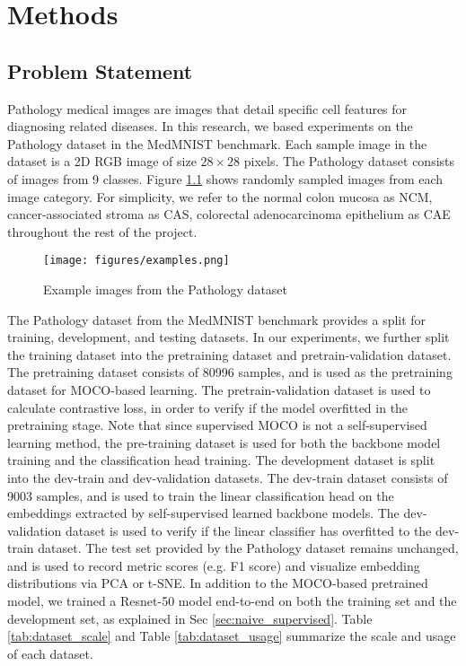 \documentclass[12pt,twoside]{report}
\begin{document}
\chapter{Methods}
\section{Problem Statement}
Pathology medical images are images that detail specific cell features for diagnosing related diseases. In this research, we based experiments on the Pathology dataset in the MedMNIST benchmark. Each sample image in the dataset is a 2D RGB image of size $28 \times 28$ pixels. The Pathology dataset consists of images from 9 classes. Figure \ref{fig:examples} shows randomly sampled images from each image category. For simplicity, we refer to the normal colon mucosa as NCM, cancer-associated stroma as CAS, colorectal adenocarcinoma epithelium as CAE throughout the rest of the project. \\

\begin{figure}
    \centering
    \texttt{[image: figures/examples.png]}
    \caption{Example images from the Pathology dataset}
    \label{fig:examples}
\end{figure}

The Pathology dataset from the MedMNIST benchmark provides a split for training, development, and testing datasets. In our experiments, we further split the training dataset into the pretraining dataset and pretrain-validation dataset. The pretraining dataset consists of 80996 samples, and is used as the pretraining dataset for MOCO-based learning. The pretrain-validation dataset is used to calculate contrastive loss, in order to verify if the model overfitted in the pretraining stage. Note that since supervised MOCO is not a self-supervised learning method, the pre-training dataset is used for both the backbone model training and the classification head training. The development dataset is split into the dev-train and dev-validation datasets. The dev-train dataset consists of 9003 samples, and is used to train the linear classification head on the embeddings extracted by self-supervised learned backbone models. The dev-validation dataset is used to verify if the linear classifier has overfitted to the dev-train dataset. The test set provided by the Pathology dataset remains unchanged, and is used to record metric scores (e.g. F1 score) and visualize embedding distributions via PCA or t-SNE. In addition to the MOCO-based pretrained model, we trained a Resnet-50 model end-to-end on both the training set and the development set, as explained in Sec \ref{sec:naive_supervised}. Table \ref{tab:dataset_scale} and Table \ref{tab:dataset_usage} summarize the scale and usage of each dataset. \\
\end{document}
